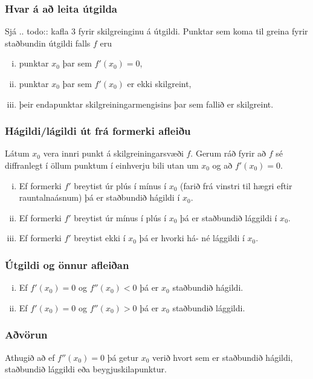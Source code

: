 \documentclass[icelandic,a4paper,12pt]{article}
\begin{document}
\subsubsection{Hvar á að leita útgilda}
Sjá 
.. todo:: kafla 3
fyrir skilgreinginu á útgildi.
Punktar sem koma til greina fyrir staðbundin útgildi falls
$f$ eru\pause
\begin{enumerate}[(i)]
\item punktar $x_0$ þar sem $f'(x_0)=0$,\pause
\item punktar $x_0$ þar sem $f'(x_0)$ er ekki skilgreint,\pause
\item þeir endapunktar skilgreiningarmengisins þar sem fallið er skilgreint.
\end{enumerate}

\subsubsection{Hágildi/lágildi út frá formerki afleiðu}
Látum $x_0$ vera innri punkt á skilgreiningarsvæði $f$.  Gerum ráð
fyrir að $f$ sé diffranlegt í öllum punktum í einhverju bili utan um
$x_0$ og að $f'(x_0)=0$.
\begin{enumerate}[(i)]
\item Ef formerki $f'$ breytist úr plús í mínus í $x_0$
(farið frá vinstri til hægri eftir rauntalnaásnum) þá er
staðbundið hágildi í $x_0$.\pause
\item Ef formerki $f'$ breytist úr mínus í plús í $x_0$
þá er staðbundið lággildi í $x_0$.\pause
\item Ef formerki $f'$ breytist ekki í $x_0$ þá er hvorki 
há- né lággildi í $x_0$.   
\end{enumerate}

\subsubsection{Útgildi og önnur afleiðan}
\begin{enumerate}[(i)]
 \item Ef $f'(x_0)=0$ og $f''(x_0)<0$ þá er $x_0$ staðbundið hágildi.\pause
 \item Ef $f'(x_0)=0$ og $f''(x_0)>0$ þá er $x_0$ staðbundið lággildi.
\end{enumerate}\pause

\subsubsection{Aðvörun}
Athugið að ef $f''(x_0)=0$ þá getur $x_0$ verið hvort sem er 
staðbundið hágildi, staðbundið lággildi eða beygjuskilapunktur. 
\end{document}
